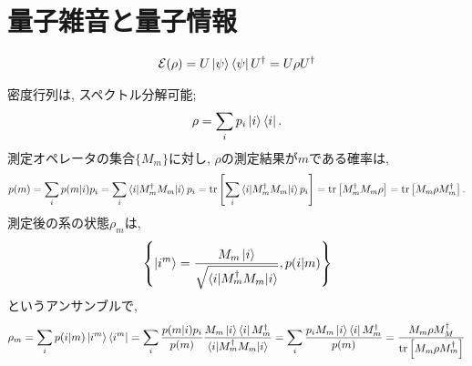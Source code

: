 \chapter{量子雑音と量子情報}

\begin{ex}
    \label{ex8.1}
    \begin{align*}
        \mathcal{E}(\rho)
        =
        U \ket{\psi} \bra{\psi} U^\dagger
        =
        U \rho U^\dagger
    \end{align*}
\end{ex}

\begin{ex}
    \label{ex8.2}
    密度行列は, スペクトル分解可能;
    \begin{align*}
        \rho = \sum_i p_i \ket{i} \bra{i}.
    \end{align*}
    測定オペレータの集合$\{ M_m\}$に対し, $\rho$の測定結果が$m$である確率は,
    \begin{align*}
        p(m) =
        \sum_i p(m|i) p_i
        =
        \sum_i \braket{i | M_m^\dagger M_m | i} p_i
        =
        \mathrm{tr} \left[ \sum_i \braket{i | M_m^\dagger M_m | i} p_i \right]
        =
        \mathrm{tr} \left[ M_m^\dagger M_m \rho\right]
        =
        \mathrm{tr} \left[M_m \rho  M_m^\dagger \right].
    \end{align*}
    測定後の系の状態$\rho_m$は,
    \begin{align*}
        \left\{ \ket{i^m} =
        \frac{M_m \ket{i}}{\sqrt{\braket{i|M_m^\dagger M_m | i}}},
        p(i|m)
        \right\}
    \end{align*}
    というアンサンブルで,
    \begin{align*}
        \rho_m
        =
        \sum_i p(i|m) \ket{i^m} \bra{i^m}
        =
        \sum_i
        \frac{p(m|i) p_i}{p(m)}
        \frac{M_m \ket{i} \bra{i} M_m^\dagger}
        {\braket{i|M_m^\dagger M_m | i}}
        =
        \sum_i
        \frac{p_i M_m \ket{i} \bra{i} M_m^\dagger}{p(m)}
        =
        \frac{M_m \rho M_M^\dagger}
        {\mathrm{tr}\left[ M_m \rho M_m^\dagger\right]}
    \end{align*}
\end{ex}

